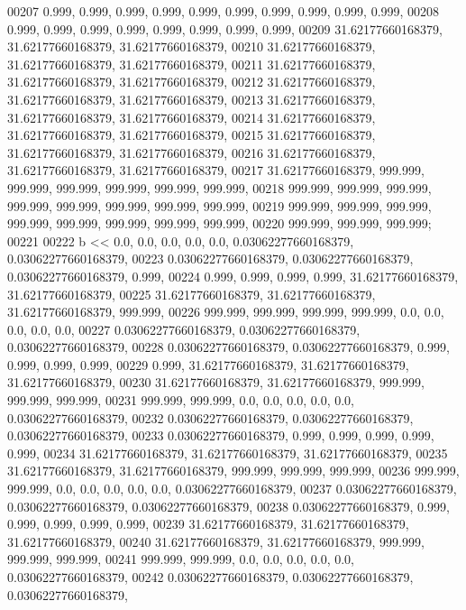 \begin{DoxyCode}
00207         0.999, 0.999, 0.999, 0.999, 0.999, 0.999, 0.999, 0.999, 0.999, 0.999,
00208         0.999, 0.999, 0.999, 0.999, 0.999, 0.999, 0.999, 0.999,
00209         31.62177660168379, 31.62177660168379, 31.62177660168379,
00210         31.62177660168379, 31.62177660168379, 31.62177660168379,
00211         31.62177660168379, 31.62177660168379, 31.62177660168379,
00212         31.62177660168379, 31.62177660168379, 31.62177660168379,
00213         31.62177660168379, 31.62177660168379, 31.62177660168379,
00214         31.62177660168379, 31.62177660168379, 31.62177660168379,
00215         31.62177660168379, 31.62177660168379, 31.62177660168379,
00216         31.62177660168379, 31.62177660168379, 31.62177660168379,
00217         31.62177660168379, 999.999, 999.999, 999.999, 999.999, 999.999, 999.999,
00218         999.999, 999.999, 999.999, 999.999, 999.999, 999.999, 999.999, 999.999,
00219         999.999, 999.999, 999.999, 999.999, 999.999, 999.999, 999.999, 999.999,
00220         999.999, 999.999, 999.999;
00221 
00222     b << 0.0, 0.0, 0.0, 0.0, 0.0, 0.03062277660168379, 0.03062277660168379,
00223         0.03062277660168379, 0.03062277660168379, 0.03062277660168379, 0.999,
00224         0.999, 0.999, 0.999, 0.999, 31.62177660168379, 31.62177660168379,
00225         31.62177660168379, 31.62177660168379, 31.62177660168379, 999.999,
00226         999.999, 999.999, 999.999, 999.999, 0.0, 0.0, 0.0, 0.0, 0.0,
00227         0.03062277660168379, 0.03062277660168379, 0.03062277660168379,
00228         0.03062277660168379, 0.03062277660168379, 0.999, 0.999, 0.999, 0.999,
00229         0.999, 31.62177660168379, 31.62177660168379, 31.62177660168379,
00230         31.62177660168379, 31.62177660168379, 999.999, 999.999, 999.999,
00231         999.999, 999.999, 0.0, 0.0, 0.0, 0.0, 0.0, 0.03062277660168379,
00232         0.03062277660168379, 0.03062277660168379, 0.03062277660168379,
00233         0.03062277660168379, 0.999, 0.999, 0.999, 0.999, 0.999,
00234         31.62177660168379, 31.62177660168379, 31.62177660168379,
00235         31.62177660168379, 31.62177660168379, 999.999, 999.999, 999.999,
00236         999.999, 999.999, 0.0, 0.0, 0.0, 0.0, 0.0, 0.03062277660168379,
00237         0.03062277660168379, 0.03062277660168379, 0.03062277660168379,
00238         0.03062277660168379, 0.999, 0.999, 0.999, 0.999, 0.999,
00239         31.62177660168379, 31.62177660168379, 31.62177660168379,
00240         31.62177660168379, 31.62177660168379, 999.999, 999.999, 999.999,
00241         999.999, 999.999, 0.0, 0.0, 0.0, 0.0, 0.0, 0.03062277660168379,
00242         0.03062277660168379, 0.03062277660168379, 0.03062277660168379,

\end{DoxyCode}
